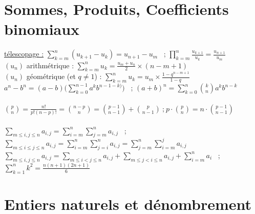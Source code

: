 \documentclass[12 pt]{book}
\begin{document}
\newpage
\section*{Sommes, Produits, Coefficients binomiaux}

\begin{flushleft}
\begin{doublespace}

	\underline{télescopage :} $\sum\limits_{k = m}^n (u_{k+1} - u_k) = u_{n+1} - u_m$ \ ; $\prod\limits_{k=m}^n \frac{u_{k+1}}{u_k} = \frac{u_{n+1}}{u_m}$\\
	$(u_n)$ arithmétrique : $\sum\limits_{k = m}^n u_k = \frac{u_m + u_n}{2} \times (n-m+1)$ \\
	$(u_n)$ géométrique (et $q\ne 1$) : $\sum\limits_{k = m}^n u_k = u_m \times \frac{1 - q^{n-m+1}}{1-q}$\\
	$a^n-b^n = (a-b)\Big(\sum\limits_{k=0}^{n-1} a^k b^{n-1-k)}\Big)$ \ ; $(a+b)^n = \sum\limits_{k=0}^n \binom{k}{n} a^k b^{n-k}$\\
	\text{ } \\
	$\binom{p}{n} = \frac{n!}{p!(n-p)!} = \binom{n-p}{n} = \binom{p-1}{n-1}+\binom{p}{n-1}  \ \text{;} \ p\cdot\binom{p}{n} = n\cdot\binom{p-1}{n-1}$\\
	\text{}\\
	$\sum\limits_{m\leq i,j\leq n} a_{i,j} = \sum\limits_{i=m}^n \sum\limits_{j=m}^n a_{i,j}$ \ ; $\sum\limits_{m\leq i \leq j \leq n} a_{i,j} = \sum\limits_{i=m}^n \sum\limits_{j=i}^n a_{i,j} = \sum\limits_{j=m}^n \sum\limits_{i=m}^j a_{i,j}$\\
	$\sum\limits_{m\leq i,j \leq n} a_{i,j} = \sum\limits_{m \leq i<j\leq n} a_{i,j} + \sum\limits_{m\leq j < i \leq n} a_{i,j} + \sum\limits_{i=m}^n a_i$ \ ; $\sum\limits_{k=1}^n k^2 = \frac{n(n+1)(2n+1)}{6}$\\

\end{doublespace}
\end{flushleft}

\section*{Entiers naturels et dénombrement}
\end{document}
